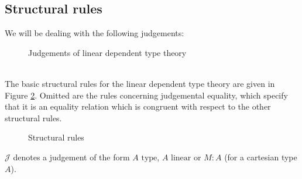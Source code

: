 \subsection{Structural rules}
We will be dealing with the following judgements:\\
\begin{figure}[h]
\caption{Judgements of linear dependent type theory}
\label{judgements}
\end{figure}
\\
The basic structural rules for the linear dependent type theory are given in Figure \ref{struc}. Omitted are the rules concerning judgemental equality, which specify that it is an equality relation which is congruent with respect to the other structural rules.
\begin{figure}[H]
  \centering
  
  \caption{Structural rules}
  \label{struc}
\end{figure}
$\mathcal{J}$ denotes a judgement of the form $A \text{ type}$, $A \text{ linear}$ or $M : A$ (for a cartesian type $A$).
